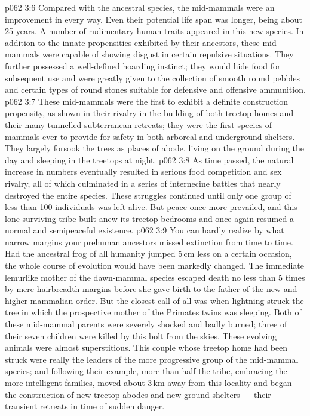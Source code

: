 \vs p062 3:6 \pc Compared with the ancestral species, the mid\hyp{}mammals were an improvement in every way. Even their potential life span was longer, being about 25 years. A number of rudimentary human traits appeared in this new species. In addition to the innate propensities exhibited by their ancestors, these mid\hyp{}mammals were capable of showing disgust in certain repulsive situations. They further possessed a well\hyp{}defined hoarding instinct; they would hide food for subsequent use and were greatly given to the collection of smooth round pebbles and certain types of round stones suitable for defensive and offensive ammunition.
\vs p062 3:7 These mid\hyp{}mammals were the first to exhibit a definite construction propensity, as shown in their rivalry in the building of both treetop homes and their many\hyp{}tunnelled subterranean retreats; they were the first species of mammals ever to provide for safety in both arboreal and underground shelters. They largely forsook the trees as places of abode, living on the ground during the day and sleeping in the treetops at night.
\vs p062 3:8 As time passed, the natural increase in numbers eventually resulted in serious food competition and sex rivalry, all of which culminated in a series of internecine battles that nearly destroyed the entire species. These struggles continued until only one group of less than 100 individuals was left alive. But peace once more prevailed, and this lone surviving tribe built anew its treetop bedrooms and once again resumed a normal and semipeaceful existence.
\vs p062 3:9 \pc You can hardly realize by what narrow margins your prehuman ancestors missed extinction from time to time. Had the ancestral frog of all humanity jumped 5\,cm less on a certain occasion, the whole course of evolution would have been markedly changed. The immediate lemurlike mother of the dawn\hyp{}mammal species escaped death no less than 5 times by mere hairbreadth margins before she gave birth to the father of the new and higher mammalian order. But the closest call of all was when lightning struck the tree in which the prospective mother of the Primates twins was sleeping. Both of these mid\hyp{}mammal parents were severely shocked and badly burned; three of their seven children were killed by this bolt from the skies. These evolving animals were almost superstitious. This couple whose treetop home had been struck were really the leaders of the more progressive group of the mid\hyp{}mammal species; and following their example, more than half the tribe, embracing the more intelligent families, moved about 3\,km away from this locality and began the construction of new treetop abodes and new ground shelters --- their transient retreats in time of sudden danger.
